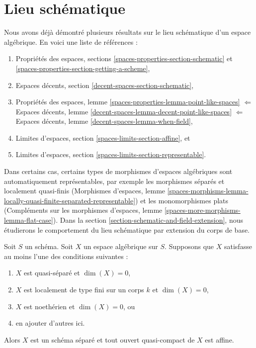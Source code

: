 \section{Lieu schématique}
\label{section-schematic}

\noindent
Nous avons déjà démontré plusieurs résultats sur le lieu schématique
d'un espace algébrique. En voici une liste de références :
\begin{enumerate}
\item Propriétés des espaces, sections
\ref{spaces-properties-section-schematic} et
\ref{spaces-properties-section-getting-a-scheme},
\item Espaces décents, section \ref{decent-spaces-section-schematic},
\item Propriétés des espaces, lemme
\ref{spaces-properties-lemma-point-like-spaces}
$\Leftarrow$
Espaces décents, lemme \ref{decent-spaces-lemma-decent-point-like-spaces}
$\Leftarrow$
Espaces décents, lemme \ref{decent-spaces-lemma-when-field},
\item Limites d'espaces, section \ref{spaces-limits-section-affine}, et
\item Limites d'espaces, section \ref{spaces-limits-section-representable}.
\end{enumerate}
Dans certains cas, certains types de morphismes d'espaces algébriques
sont automatiquement représentables, par exemple les morphismes
séparés et localement quasi-finis (Morphismes d'espaces, lemme
\ref{spaces-morphisms-lemma-locally-quasi-finite-separated-representable})
et les monomorphismes plats (Compléments sur les morphismes d'espaces, lemme
\ref{spaces-more-morphisms-lemma-flat-case}).
Dans la section \ref{section-schematic-and-field-extension},
nous étudierons le comportement du lieu
schématique par extension du corps de base.

\begin{lemma}
\label{lemma-locally-finite-type-dim-zero}
Soit $S$ un schéma. Soit $X$ un espace algébrique sur $S$.
Supposons que $X$ satisfasse au moins l'une des conditions suivantes :
\begin{enumerate}
\item $X$ est quasi-séparé et $\dim(X) = 0$,
\item $X$ est localement de type fini sur un corps $k$ et $\dim(X) = 0$,
\item $X$ est noethérien et $\dim(X) = 0$, ou
\item en ajouter d'autres ici.
\end{enumerate}
Alors $X$ est un schéma séparé et tout ouvert quasi-compact de $X$ est affine.
\end{lemma}

